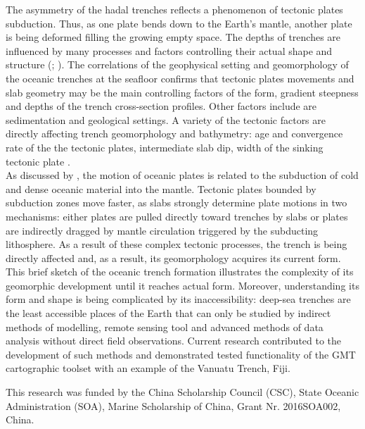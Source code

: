 \documentclass[USenglish]{article}
\begin{document}
The asymmetry of the hadal trenches reflects a phenomenon of tectonic plates subduction. Thus, as one plate bends down to the Earth's mantle, another plate is being deformed filling the growing empty space. The depths of trenches are influenced by many processes and factors controlling their actual shape and structure (\cite{Lemenkova201872}; \cite{Lemenkova201991}). The correlations of the geophysical setting and geomorphology of the oceanic trenches at the seafloor confirms that tectonic plates movements and slab geometry may be the main controlling factors of the form, gradient steepness and depths of the trench cross-section profiles. Other factors include are sedimentation and geological settings. A variety of the tectonic factors are directly affecting trench geomorphology and bathymetry: age and convergence rate of the the tectonic plates, intermediate slab dip, width of the sinking tectonic plate \citep{Stern}. \\
As discussed by \citet{Faccennaetal2007}, the motion of oceanic plates is related to the subduction of cold and dense oceanic material into the mantle. Tectonic plates bounded by subduction zones move faster, as slabs strongly determine plate motions in two mechanisms: \citep{Conrad} either plates are pulled directly toward trenches by slabs  or plates are indirectly dragged by mantle circulation triggered by the subducting lithosphere. As a result of these complex tectonic processes, the trench is being directly affected and, as a result, its geomorphology acquires its current form. \\
This brief sketch of the oceanic trench formation illustrates the complexity of its geomorphic development until it reaches actual form. Moreover, understanding its form and shape is being complicated by its inaccessibility: deep-sea trenches are the least accessible places of the Earth that can only be studied by indirect methods of modelling, remote sensing tool and advanced methods of data analysis without direct field observations. Current research contributed to the development of such methods and demonstrated tested functionality of the GMT cartographic toolset with an example of the Vanuatu Trench, Fiji.



\begin{acknowledgement}
This research was funded by the China Scholarship Council (CSC), State Oceanic Administration (SOA), Marine Scholarship of China, Grant Nr. 2016SOA002, China.
\end{acknowledgement}

%
%
\printbibliography
\end{document}
